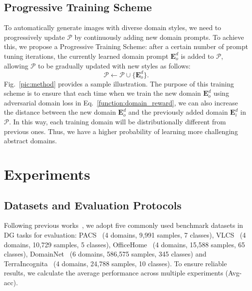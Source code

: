 \subsection{Progressive Training Scheme}
To automatically generate images with diverse domain styles, we need to progressively update $\mathcal{P}$ by continuously adding new domain prompts. 
To achieve this, we propose a Progressive Training Scheme: after a certain number of prompt tuning iterations, the currently learned domain prompt $\mathbf{E}_o^d$ is added to $\mathcal{P}$, allowing $\mathcal{P}$ to be gradually updated with new styles as follows:
\begin{equation}
    \mathcal{P} \leftarrow \mathcal{P} \cup \{\mathbf{E}^d_o\}.
\end{equation}
Fig.~\textcolor{red}{\ref{pic:method}} provides a sample illustration. 
The purpose of this training scheme is to ensure that each time when we train the new domain $\mathbf{E}_{o}^d$ using adversarial domain loss in Eq.~\textcolor{red}{\ref{function:domain_reward}}, we can also increase the distance between the new domain $\mathbf{E}_{o}^d$ and the previously added domain $\mathbf{E}_i^d$ in $\mathcal{P}$. 
In this way, each training domain will be distributionally different from previous ones. 
Thus, we have a higher probability of learning more challenging abstract domains.

\section{Experiments}
\subsection{Datasets and Evaluation Protocols}
Following previous works~\cite{qu2023modality, shinunknown},
we adopt five commonly used benchmark datasets in DG tasks for evaluation:
PACS~\cite{li2017deeper} (4 domains, 9,991 samples, 7 classes), VLCS~\cite{li2017deeper} (4 domains, 10,729 samples, 5 classes), OfficeHome~\cite{venkateswara2017deep} (4 domains, 15,588 samples, 65 classes), DomainNet~\cite{peng2019moment} (6 domains, 586,575 samples, 345 classes) and TerraIncognita~\cite{beery2018recognition} (4 domains, 24,788 samples, 10 classes). 
To ensure reliable results, we calculate the average performance across multiple experiments (Avg-acc).

